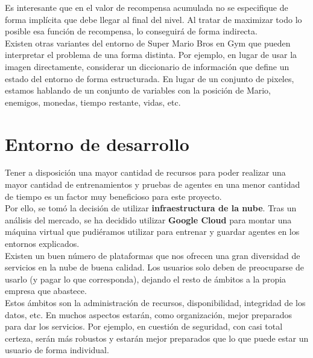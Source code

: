 \documentclass[11pt,fleqn]{book} %
\begin{document}
Es interesante que en el valor de recompensa acumulada no se especifique de forma implícita que debe llegar al final del nivel. Al tratar de maximizar todo lo posible esa función de recompensa, lo conseguirá de forma indirecta. \\


Existen otras variantes del entorno de Super Mario Bros en Gym que pueden interpretar el problema de una forma distinta. Por ejemplo, en lugar de usar la imagen directamente, considerar un diccionario de información que define un estado del entorno de forma estructurada. En lugar de un conjunto de pixeles, estamos hablando de un conjunto de variables con la posición de Mario, enemigos, monedas, tiempo restante, vidas, etc.

\chapter{Entorno de desarrollo}\label{sec:cloud}

Tener a disposición una mayor cantidad de recursos para poder realizar una mayor cantidad de entrenamientos y pruebas de agentes en una menor cantidad de tiempo es un factor muy beneficioso para este proyecto. \\

Por ello, se tomó la decisión de utilizar \textbf{infraestructura de la nube}. Tras un análisis del mercado, se ha decidido utilizar \textbf{Google Cloud} para montar una máquina virtual que pudiéramos utilizar para entrenar y guardar agentes en los entornos explicados.\\

Existen un buen número de plataformas que nos ofrecen una gran diversidad de servicios en la nube de buena calidad. Los usuarios solo deben de preocuparse de usarlo (y pagar lo que corresponda), dejando el resto de ámbitos a la propia empresa que abastece. \\

Estos ámbitos son la administración de recursos, disponibilidad, integridad de los datos, etc. En muchos aspectos estarán, como organización, mejor preparados para dar los servicios. Por ejemplo, en cuestión de seguridad, con casi total certeza, serán más robustos y estarán mejor preparados que lo que puede estar un usuario de forma individual. \\
\end{document}

